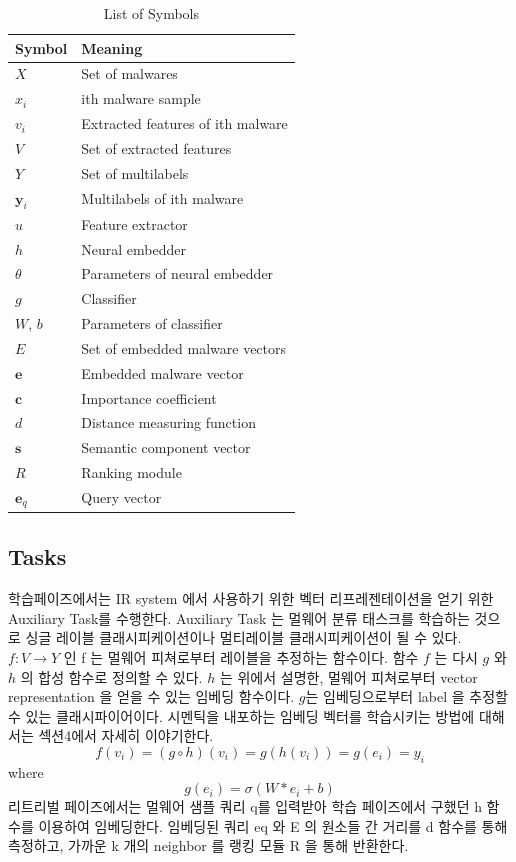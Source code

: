 \begin{table}[!htb] %
\caption{List of Symbols}
\label{tab:notation}
\begin{minipage}{\columnwidth}
\begin{center}
\begin{tabular}{ll}
\toprule
Symbol & Meaning\\
\midrule
  $X$ & Set of malwares \\
  $x_i$ & ith malware sample \\
  $v_i$ & Extracted features of ith malware\\
  $V$ & Set of extracted features \\
  $Y$ & Set of multilabels  \\
  $\mathbf{y}_{i}$ & Multilabels of ith malware\\
  $u$ & Feature extractor \\
  $h$ & Neural embedder \\
  $\theta$ & Parameters of neural embedder \\
  $g$ & Classifier \\   
  $W$, $b$ & Parameters of classifier \\  
  $E$ & Set of embedded malware vectors \\
  $\mathbf{e}$ & Embedded malware vector \\
  $\mathbf{c}$ & Importance coefficient \\
  $d$ & Distance measuring function \\
  $\mathbf{s}$ & Semantic component vector \\
  $R$ & Ranking module \\
  $\mathbf{e}_q$ & Query vector \\
  
\bottomrule
\end{tabular}
\end{center}
\bigskip\centering
\end{minipage}
\end{table}


\subsection{Tasks}
학습페이즈에서는 IR system 에서 사용하기 위한 벡터 리프레젠테이션을 얻기 위한 Auxiliary Task를 수행한다. Auxiliary Task 는 멀웨어 분류 태스크를 학습하는 것으로 싱글 레이블 클래시피케이션이나 멀티레이블 클래시피케이션이 될 수 있다. $f: V \rightarrow Y $ 인 f 는 멀웨어 피쳐로부터 레이블을 추정하는 함수이다. 함수 $f$ 는 다시 $g$ 와 $h$ 의 합성 함수로 정의할 수 있다. $h$ 는 위에서 설명한, 멀웨어 피쳐로부터 vector representation 을 얻을 수 있는 임베딩 함수이다. $g$는 임베딩으로부터 label 을 추정할 수 있는 클래시파이어이다. 시멘틱을 내포하는 임베딩 벡터를 학습시키는 방법에 대해서는 섹션4에서 자세히 이야기한다. 
\[
f(v_i) = (g \circ h)(v_i) = g(h(v_i)) = g(e_i) = y_i 
\]
where
\[
g(e_i) = \sigma (W*e_i + b) 
\]
리트리벌 페이즈에서는 멀웨어 샘플 쿼리 q를 입력받아 학습 페이즈에서 구했던 h 함수를 이용하여 임베딩한다. 임베딩된 쿼리 eq 와 E 의 원소들 간 거리를 d 함수를 통해 측정하고, 가까운 k 개의 neighbor 를 랭킹 모듈 R 을 통해 반환한다. 

